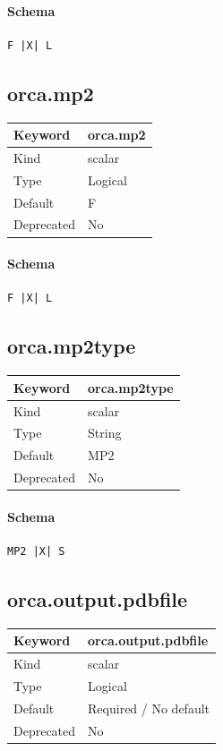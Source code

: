 \documentclass[11pt]{article}
\begin{document}
{{{{{\paragraph{Schema}
\begin{Verbatim}
F |X| L
\end{Verbatim}

\subsection{orca.mp2}
\label{kw:orca-mp2}
\begin{longtable}{|p{1.5in}|p{4.5in}|}
\hline
Keyword & orca.mp2 \\
\hline
Kind & scalar \\
\hline
Type & Logical \\
\hline
Default & F \\
\hline
Deprecated & No \\
\hline
\end{longtable}
\paragraph{Schema}
\begin{Verbatim}
F |X| L
\end{Verbatim}

\subsection{orca.mp2type}
\label{kw:orca-mp2type}
\begin{longtable}{|p{1.5in}|p{4.5in}|}
\hline
Keyword & orca.mp2type \\
\hline
Kind & scalar \\
\hline
Type & String \\
\hline
Default & MP2 \\
\hline
Deprecated & No \\
\hline
\end{longtable}
\paragraph{Schema}
\begin{Verbatim}
MP2 |X| S
\end{Verbatim}

\subsection{orca.output.pdbfile}
\label{kw:orca-output-pdbfile}
\begin{longtable}{|p{1.5in}|p{4.5in}|}
\hline
Keyword & orca.output.pdbfile \\
\hline
Kind & scalar \\
\hline
Type & Logical \\
\hline
Default & Required / No default \\
\hline
Deprecated & No \\
\hline
\end{longtable}
}}}}}
\end{document}

